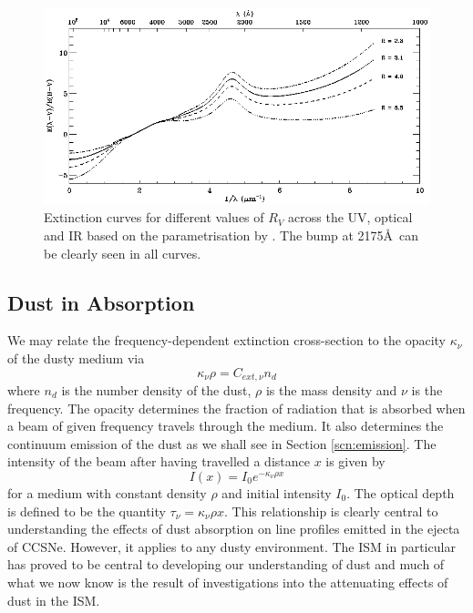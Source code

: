 \begin{figure}
\centering
\includegraphics[clip=true,scale=0.53,trim= 0 0 0 0]{chapters/chapter1/figs/extinction_curves2.png}
\caption{Extinction curves for different values of $R_V$ across the UV, optical and IR based on the parametrisation by \citet{Cardelli1989}.  The bump at 2175\AA\ can be clearly seen in all curves.}
\label{fig:ext_curve}
\end{figure}

\subsection{Dust in Absorption}
\label{scn:abs}
 

We may relate the frequency-dependent extinction cross-section to the opacity $\kappa_{\nu}$ of the dusty medium via
\begin{equation}
\kappa_{\nu} \rho = C_{ext,\nu} n_d
\end{equation}
\noindent where $n_d$ is the number density of the dust, $\rho$ is the mass density and $\nu$ is the frequency.  The opacity determines the fraction of radiation that is absorbed when a beam of given frequency travels through the medium.  It also determines the continuum emission of the dust as we shall see in Section \ref{scn:emission}.  The intensity of the beam after having travelled a distance $x$ is given by
\begin{equation}
I(x)=I_0 e^{-\kappa_{\nu} \rho x}
\end{equation}
\noindent  for a medium with constant density $\rho$ and initial intensity $I_0$.  The optical depth  is defined to be the quantity $\tau_{\nu}=\kappa_{\nu} \rho x$.  This relationship is clearly central to understanding the effects of dust absorption on line profiles emitted in the ejecta of CCSNe.  However, it applies to any dusty environment.  The ISM in particular has proved to be central to developing our understanding of dust and much of what we now know is the result of investigations into the attenuating effects of dust in the ISM.  
 
